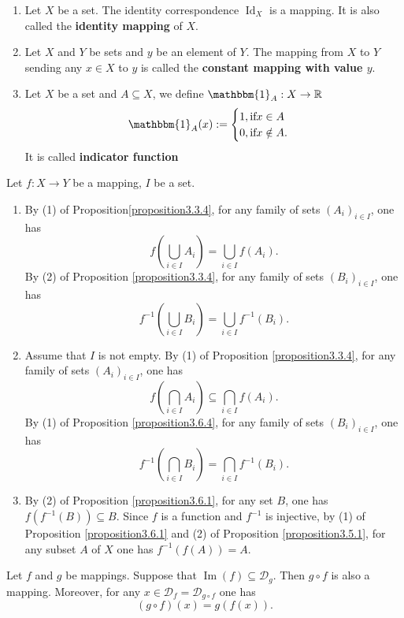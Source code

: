 \documentclass{book}
\numberwithin{equation}{section}
\begin{document}
\begin{exampleenv}
    \quad
    \begin{enumerate}
    \item Let \( X \) be a set. The identity correspondence \( \operatorname{Id}_X \) is a mapping. It is also called the \textbf{identity mapping} of \( X \).
    \item Let \( X \) and \( Y \) be sets and \( y \) be an element of \( Y \). The mapping from \( X \) to \( Y \) sending any \( x \in X \) to \( y \) is called the \textbf{constant mapping with value \( y \)}.
    \item Let $X$ be a set and $A\subseteq X$, we define $\mathbbm{1}_A:X\rightarrow \mathbb{R}$   
    $$\mathbbm{1}_A(x):=\begin{cases}
 1, \text{if}\space x \in A \\0,\text{if}\space x \notin A.

\end{cases}$$ 
It is called \textbf{indicator function}
\end{enumerate}
\end{exampleenv}


\begin{remark}
   Let \( f: X \to Y \) be a mapping, \( I \) be a set.
\begin{enumerate}
    \item By (1) of Proposition\ref{proposition3.3.4}, for any family of sets \( (A_i)_{i \in I} \), one has
    \[
    f\left(\bigcup_{i \in I} A_i\right) = \bigcup_{i \in I} f(A_i).
    \]
    By (2) of Proposition \ref{proposition3.3.4}, for any family of sets \( (B_i)_{i \in I} \), one has
    \[
    f^{-1}\left(\bigcup_{i \in I} B_i\right) = \bigcup_{i \in I} f^{-1}(B_i).
    \]
    \item Assume that \( I \) is not empty. By (1) of Proposition \ref{proposition3.3.4}, for any family of sets \( (A_i)_{i \in I} \), one has
    \[
    f\left(\bigcap_{i \in I} A_i\right) \subseteq \bigcap_{i \in I} f(A_i).
    \]
    By (1) of Proposition \ref{proposition3.6.4}, for any family of sets \( (B_i)_{i \in I} \), one has
    \[
    f^{-1}\left(\bigcap_{i \in I} B_i\right) = \bigcap_{i \in I} f^{-1}(B_i).
    \]
    \item By (2) of Proposition \ref{proposition3.6.1}, for any set \( B \), one has \( f(f^{-1}(B)) \subseteq B \). Since \( f \) is a function and \( f^{-1} \) is injective, by (1) of Proposition \ref{proposition3.6.1} and (2) of Proposition \ref{proposition3.5.1}, for any subset \( A \) of \( X \) one has \( f^{-1}(f(A)) = A \).
\end{enumerate}

 
\end{remark}
\begin{propositionenv}\label{proposition3.7.1}
    Let \( f \) and \( g \) be mappings. Suppose that \( \operatorname{Im}(f) \subseteq \mathscr{D}_g \). Then \( g \circ f \) is also a mapping. Moreover, for any \( x \in \mathscr{D}_f = \mathscr{D}_{g \circ f} \) one has
\[
(g \circ f)(x) = g(f(x)).
\]

\end{propositionenv}
\end{document}

